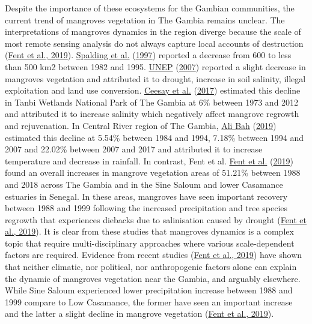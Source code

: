 \documentclass[utf8]{frontiersSCNS}
\begin{document}
Despite the importance of these ecosystems for the Gambian communities,
the current trend of mangroves vegetation in The Gambia remains unclear.
The interpretations of mangroves dynamics in the region diverge because
the scale of most remote sensing analysis do not always capture local
accounts of destruction (\protect\hyperlink{ref-Fent-et-al-2019}{Fent et
al., 2019}). \protect\hyperlink{ref-Spalding-et-al-1997}{Spalding et
al.} (\protect\hyperlink{ref-Spalding-et-al-1997}{1997}) reported a
decrease from 600 to less than 500 km2 between 1982 and 1995.
\protect\hyperlink{ref-UNEP-2007}{UNEP}
(\protect\hyperlink{ref-UNEP-2007}{2007}) reported a slight decrease in
mangroves vegetation and attributed it to drought, increase in soil
salinity, illegal exploitation and land use conversion.
\protect\hyperlink{ref-Ceesay-et-al-2017}{Ceesay et al.}
(\protect\hyperlink{ref-Ceesay-et-al-2017}{2017}) estimated this decline
in Tanbi Wetlands National Park of The Gambia at 6\% between 1973 and
2012 and attributed it to increase salinity which negatively affect
mangrove regrowth and rejuvenation. In Central River region of The
Gambia, \protect\hyperlink{ref-AliBah-2019}{Ali Bah}
(\protect\hyperlink{ref-AliBah-2019}{2019}) estimated this decline at
5.54\% between 1984 and 1994, 7.18\% between 1994 and 2007 and 22.02\%
between 2007 and 2017 and attributed it to increase temperature and
decrease in rainfall. In contrast, Fent et al.
\protect\hyperlink{ref-Fent-et-al-2019}{Fent et al.}
(\protect\hyperlink{ref-Fent-et-al-2019}{2019}) found an overall
increases in mangrove vegetation areas of 51.21\% between 1988 and 2018
across The Gambia and in the Sine Saloum and lower Casamance estuaries
in Senegal. In these areas, mangroves have seen important recovery
between 1988 and 1999 following the increased precipitation and tree
species regrowth that experiences diebacks due to salinisation caused by
drought (\protect\hyperlink{ref-Fent-et-al-2019}{Fent et al., 2019}). It
is clear from these studies that mangroves dynamics is a complex topic
that require multi-disciplinary approaches where various scale-dependent
factors are required. Evidence from recent studies
(\protect\hyperlink{ref-Fent-et-al-2019}{Fent et al., 2019}) have shown
that neither climatic, nor political, nor anthropogenic factors alone
can explain the dynamic of mangroves vegetation near the Gambia, and
arguably elsewhere. While Sine Saloum experienced lower precipitation
increase between 1988 and 1999 compare to Low Casamance, the former have
seen an important increase and the latter a slight decline in mangrove
vegetation (\protect\hyperlink{ref-Fent-et-al-2019}{Fent et al., 2019}).
\end{document}
